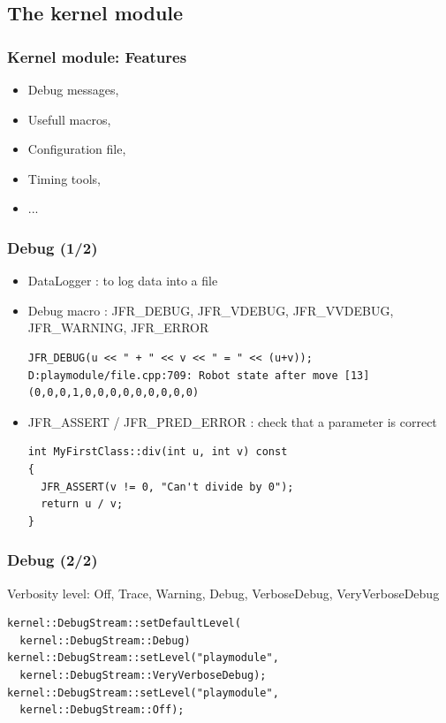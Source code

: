 \documentclass[compress]{beamer}
\begin{document}

\subsection{The kernel module}

\begin{frame}
  \frametitle{Kernel module: Features}
  \begin{itemize}
   \item Debug messages,
   \item Usefull macros,
   \item Configuration file,
   \item Timing tools,
   \item ...
  \end{itemize}
\end{frame}


\begin{frame}[fragile]
  \frametitle{Debug (1/2)}
  \begin{itemize}
    \item<1-> DataLogger : to log data into a file
    \item<2-> Debug macro : JFR\_DEBUG, JFR\_VDEBUG, JFR\_VVDEBUG, JFR\_WARNING, JFR\_ERROR
      \begin{lstlisting}
JFR_DEBUG(u << " + " << v << " = " << (u+v));
D:playmodule/file.cpp:709: Robot state after move [13](0,0,0,1,0,0,0,0,0,0,0,0,0)
      \end{lstlisting}
   \item<3-> JFR\_ASSERT / JFR\_PRED\_ERROR : check that a parameter is correct
      \begin{lstlisting}
int MyFirstClass::div(int u, int v) const
{
  JFR_ASSERT(v != 0, "Can't divide by 0");
  return u / v;
}
      \end{lstlisting}
  \end{itemize}
\end{frame}

\begin{frame}[fragile]
  \frametitle{Debug (2/2)}
      Verbosity level: Off, Trace, Warning,  Debug, VerboseDebug, VeryVerboseDebug
      \begin{lstlisting}
kernel::DebugStream::setDefaultLevel(
  kernel::DebugStream::Debug)
kernel::DebugStream::setLevel("playmodule",
  kernel::DebugStream::VeryVerboseDebug);
kernel::DebugStream::setLevel("playmodule",
  kernel::DebugStream::Off);
      \end{lstlisting}
\end{frame}
\end{document}
